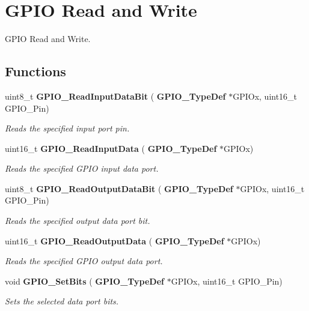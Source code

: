 \section{G\+P\+IO Read and Write}
\label{group__GPIO__Group2}


G\+P\+IO Read and Write.  


\subsection*{Functions}
\begin{DoxyCompactItemize}
\item 
uint8\+\_\+t \textbf{ G\+P\+I\+O\+\_\+\+Read\+Input\+Data\+Bit} (\textbf{ G\+P\+I\+O\+\_\+\+Type\+Def} $\ast$G\+P\+I\+Ox, uint16\+\_\+t G\+P\+I\+O\+\_\+\+Pin)
\begin{DoxyCompactList}\small\item\em Reads the specified input port pin. \end{DoxyCompactList}\item 
uint16\+\_\+t \textbf{ G\+P\+I\+O\+\_\+\+Read\+Input\+Data} (\textbf{ G\+P\+I\+O\+\_\+\+Type\+Def} $\ast$G\+P\+I\+Ox)
\begin{DoxyCompactList}\small\item\em Reads the specified G\+P\+IO input data port. \end{DoxyCompactList}\item 
uint8\+\_\+t \textbf{ G\+P\+I\+O\+\_\+\+Read\+Output\+Data\+Bit} (\textbf{ G\+P\+I\+O\+\_\+\+Type\+Def} $\ast$G\+P\+I\+Ox, uint16\+\_\+t G\+P\+I\+O\+\_\+\+Pin)
\begin{DoxyCompactList}\small\item\em Reads the specified output data port bit. \end{DoxyCompactList}\item 
uint16\+\_\+t \textbf{ G\+P\+I\+O\+\_\+\+Read\+Output\+Data} (\textbf{ G\+P\+I\+O\+\_\+\+Type\+Def} $\ast$G\+P\+I\+Ox)
\begin{DoxyCompactList}\small\item\em Reads the specified G\+P\+IO output data port. \end{DoxyCompactList}\item 
void \textbf{ G\+P\+I\+O\+\_\+\+Set\+Bits} (\textbf{ G\+P\+I\+O\+\_\+\+Type\+Def} $\ast$G\+P\+I\+Ox, uint16\+\_\+t G\+P\+I\+O\+\_\+\+Pin)
\begin{DoxyCompactList}\small\item\em Sets the selected data port bits. \end{DoxyCompactList}\item 

\end{DoxyCompactItemize}
